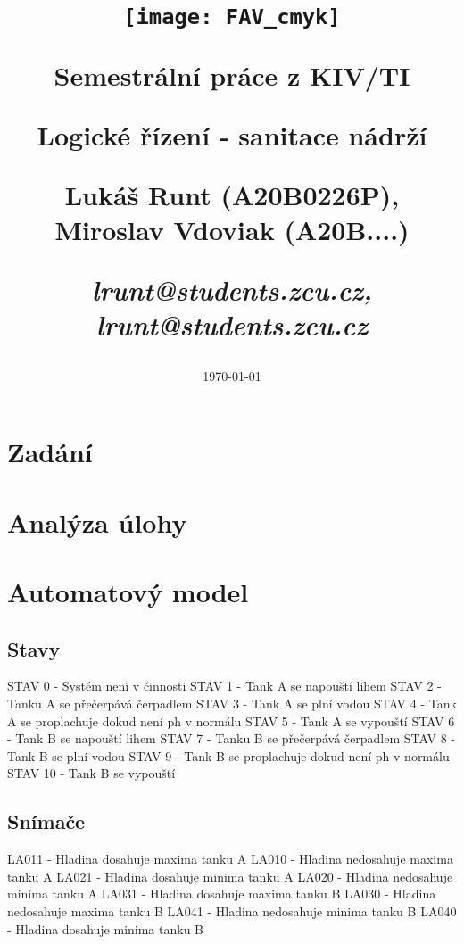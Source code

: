 \documentclass[12pt, a4paper]{article}
\title{\texttt{[image: FAV\_cmyk]}

{\huge Semestrální práce z KIV/TI}

\vspace{0.5cm}
{\LARGE Logické řízení - sanitace nádrží}
\vspace{1cm} 

\Large Lukáš Runt (A20B0226P), Miroslav Vdoviak (A20B....)
\vspace{0.5cm} 

\large \itshape lrunt@students.zcu.cz, lrunt@students.zcu.cz
}
\date{\vspace{6cm} \today}
\begin{document}
\begin{titlepage}
\clearpage\maketitle
\thispagestyle{empty}
\end{titlepage}
\tableofcontents \newpage

\section{Zadání}

\section{Analýza úlohy}

\section{Automatový model}

\subsection{Stavy}
STAV 0 - Systém není v činnosti \newline 
STAV 1 - Tank A se napouští lihem \newline 
STAV 2 - Tanku A se přečerpává čerpadlem \newline 
STAV 3 - Tank A se plní vodou \newline 
STAV 4 - Tank A se proplachuje dokud není ph v normálu \newline 
STAV 5 - Tank A se vypouští \newline 
STAV 6 - Tank B se napouští lihem \newline 
STAV 7 - Tanku B se přečerpává čerpadlem \newline 
STAV 8 - Tank B se plní vodou \newline 
STAV 9 - Tank B se proplachuje dokud není ph v normálu \newline 
STAV 10 - Tank B se vypouští 

\subsection{Snímače}
LA011 - Hladina dosahuje maxima tanku A \newline 
LA010 - Hladina nedosahuje maxima tanku A \newline 
LA021 - Hladina dosahuje minima tanku A \newline 
LA020 - Hladina nedosahuje minima tanku A \newline 
LA031 - Hladina dosahuje maxima tanku B \newline
LA030 - Hladina nedosahuje maxima tanku B \newline 
LA041 - Hladina nedosahuje minima tanku B \newline 
LA040 - Hladina dosahuje minima tanku B
\end{document}
